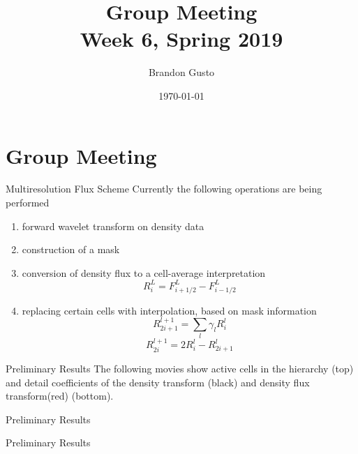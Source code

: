 \documentclass{beamer}
\begin{document}
\section{Group Meeting}
\title{Group Meeting \\ Week 6, Spring 2019}
\author{Brandon Gusto} %
\date{\today}
\frame{\titlepage}

\begin{frame}{Multiresolution Flux Scheme}
  Currently the following operations are being performed
  \begin{enumerate}
    \item<2-> forward wavelet transform on density data
    \item<3-> construction of a mask
    \item<4-> conversion of density flux to a cell-average interpretation
      \[ R_{i}^{L} = F_{i+1/2}^{L} - F_{i-1/2}^{L} \]
    \item<5-> replacing certain cells with interpolation, based on mask information
      \[ R_{2i+1}^{l+1} = \sum_{l} \gamma_{l} R_{i}^{l} \]
      \[ R_{2i}^{l+1} = 2 R_{i}^{l} - R_{2i+1}^{l} \]
  \end{enumerate}
\end{frame}


\begin{frame}{Preliminary Results}
  The following movies show active cells in the hierarchy (top) and detail coefficients of the
  density transform (black) and density flux transform(red) (bottom).
  \begin{figure}
    \center
  \end{figure}
\end{frame}

\begin{frame}{Preliminary Results}
  \begin{figure}
    \center
  \end{figure}
\end{frame}

\begin{frame}{Preliminary Results}
  \begin{figure}
    \center
  \end{figure}
\end{frame}
\end{document}
